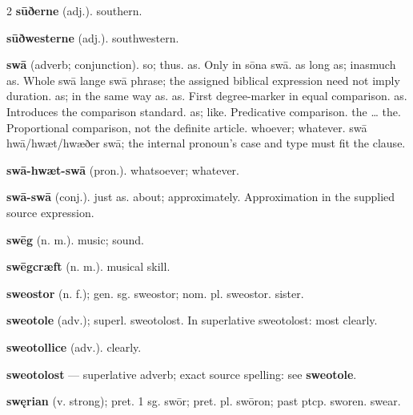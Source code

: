 \begin{multicols*}{2}
\textbf{sūðerne} (adj.). southern.\par
\textbf{sūðwesterne} (adj.). southwestern.\par
\textbf{swā} (adverb; conjunction). so; thus. as. Only in sōna swā. as long as; inasmuch as. Whole swā lange swā phrase; the assigned biblical expression need not imply duration. as; in the same way as. as. First degree-marker in equal comparison. as. Introduces the comparison standard. as; like. Predicative comparison. the … the. Proportional comparison, not the definite article. whoever; whatever. swā hwā/hwæt/hwæðer swā; the internal pronoun's case and type must fit the clause.\par
\textbf{swā-hwæt-swā} (pron.). whatsoever; whatever.\par
\textbf{swā-swā} (conj.). just as. about; approximately. Approximation in the supplied source expression.\par
\textbf{swēg} (n. m.). music; sound.\par
\textbf{swēgcræft} (n. m.). musical skill.\par
\textbf{sweostor} (n. f.); gen. sg. sweostor; nom. pl. sweostor. sister.\par
\textbf{sweotole} (adv.); superl. sweotolost. In superlative sweotolost: most clearly.\par
\textbf{sweotollice} (adv.). clearly.\par
\textbf{sweotolost} — superlative adverb; exact source spelling: see \textbf{sweotole}.\par
\textbf{swęrian} (v. strong); pret. 1 sg. swōr; pret. pl. swōron; past ptcp. sworen. swear.\par

\end{multicols*}
